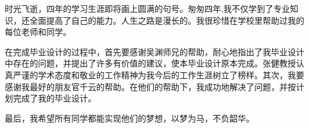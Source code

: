 时光飞逝，四年的学习生涯即将画上圆满的句号。匆匆四年,我不仅学到了专业知识，还全面提高了自己的能力。人生之路是漫长的。我很珍惜在学校里帮助过我的每位老师和同学。

在完成毕业设计的过程中，首先要感谢吴渊师兄的帮助，耐心地指出了我毕业设计中存在的问题，并提出了许多有价值的建议，使本毕业设计原本完成。张健教授认真严谨的学术态度和敬业的工作精神为我今后的工作生涯树立了榜样。其次，我要感谢我最好的朋友官千云的帮助。在他们的帮助下，我成功地解决了问题，并按计划完成了我的毕业设计。

最后，我希望所有同学都能实现他们的梦想，以梦为马，不负韶华。